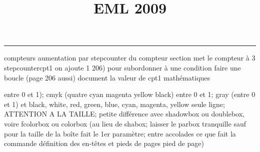 \documentclass[11pt]{article}%
\title{\bf \vspace{-2cm} EML 2009} %
\author{} %
\date{} %
\renewcommand{\headrulewidth}{0pt}%
\renewcommand{\footrulewidth}{0.4pt}%
\begin{document}
\maketitle %
\vspace{-1.4cm}\hrule %
\thispagestyle{fancy}

\vspace*{.2cm}



compteurs%
aumentation par stepcounter du compteur section%
met le compteur à 3%
stepcounter{cpt1} on ajoute 1%
206) pour subordonner à une condition %
faire une boucle (page 206 aussi) %
document la valeur de cpt1 
mathématiques\newcommand{\ch}{\operatorname{ch}} 
\newcommand{\sh}{\operatorname{sh}}
\renewcommand{\tanh}{\operatorname{th}}
\renewcommand{\sinh}{\operatorname{sh}}
\renewcommand{\cosh}{\operatorname{ch}}
\newcommand{\argsh}{\operatorname{argsh}}
\newcommand{\argch}{\operatorname{argch}}
\newcommand{\argth}{\operatorname{argth}}
\newcommand{\ker}{\operatorname{Ker}}
\renewcommand{\im}{\operatorname{Im}}
\newcommand{\rg}{\operatorname{rg}}
\newcommand{\Id}{\operatorname{Id}}
\newcommand{\id}{\operatorname{id}}
\renewcommand{\leq}{\leq}
\renewcommand{\geq}{\geq }

entre 0 et 1); cmyk (quatre cyan magenta yellow black) entre 0 et 1;
gray (entre 0 et 1) et black, white, red, green, blue, cyan, magenta,
yellow%
seule ligne; ATTENTION A LA TAILLE; petite différence avec shadowbox ou
doublebox, voire fcolorbox ou colorbox (au lieu de shabox; laisser le
parbox tranquille sauf pour la taille de la boîte
\newcommand{\Tbox}[1]{\begin{center} \shabox{\parbox{0.6
\linewidth}{#1}} \end{center}} %
fait le 1er paramètre; entre accolades ce que fait la commande
définition des en-têtes et pieds de pages\pagestyle{fancy}
\chead{}
\rfoot[ \ \thepage]{\thepage}
\cfoot{}
\lfoot{}
\thispagestyle{fancy} %
pied de page)\renewcommand{\footrulewidth}{0.4pt}
\renewcommand{\headrulewidth}{0.4pt}
\end{document}
